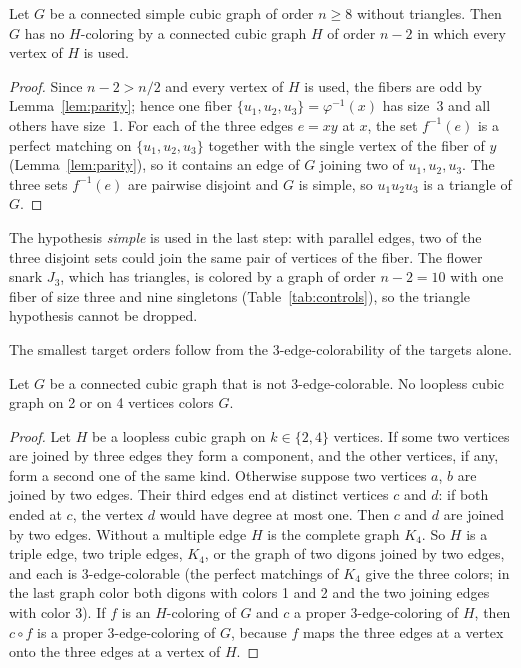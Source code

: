 \begin{proposition}[\evD]\label{prop:nminus2}
Let $G$ be a connected simple cubic graph of order $n \ge 8$ without triangles. Then $G$ has no
$H$-coloring by a connected cubic graph $H$ of order $n - 2$ in which every vertex of $H$ is used.
\end{proposition}

\begin{proof}
Since $n - 2 > n/2$ and every vertex of $H$ is used, the fibers are odd by
Lemma~\ref{lem:parity}; hence one fiber $\{u_1, u_2, u_3\} = \varphi^{-1}(x)$ has size~3 and all
others have size~1. For each of the three edges $e = xy$ at $x$, the set $f^{-1}(e)$ is a perfect matching on
$\{u_1, u_2, u_3\}$ together with the single vertex of the fiber of $y$
(Lemma~\ref{lem:parity}), so it contains an edge of $G$ joining two of $u_1, u_2, u_3$. The three
sets $f^{-1}(e)$ are pairwise disjoint and $G$ is simple, so $u_1u_2u_3$ is a triangle of $G$.
\end{proof}

The hypothesis \emph{simple} is used in the last step: with parallel edges, two of the three disjoint sets could join the
same pair of vertices of the fiber. The flower snark $J_3$, which has triangles, is colored by a graph of order $n - 2 = 10$ with
one fiber of size three and nine singletons (Table~\ref{tab:controls}), so the triangle hypothesis cannot be dropped.

The smallest target orders follow from the 3-edge-colorability of the targets alone.

\begin{proposition}[\evD]\label{prop:small}
Let $G$ be a connected cubic graph that is not 3-edge-colorable. No loopless cubic graph on 2 or on 4 vertices colors $G$.
\end{proposition}

\begin{proof}
Let $H$ be a loopless cubic graph on $k \in \{2, 4\}$ vertices. If some two vertices are joined by three edges they form a
component, and the other vertices, if any, form a second one of the same kind. Otherwise suppose two vertices $a$, $b$ are joined by two edges.
Their third edges end at distinct vertices $c$ and $d$: if both ended at $c$, the vertex $d$ would have degree at most one. Then $c$ and $d$ are
joined by two edges. Without a multiple edge $H$ is the complete graph $K_4$. So $H$ is a triple edge, two triple edges, $K_4$, or the
graph of two digons joined by two edges, and each is 3-edge-colorable (the perfect matchings of $K_4$ give the three colors; in the last graph
color both digons with colors 1 and 2 and the two joining edges with color 3). If $f$ is an $H$-coloring of $G$ and $c$ a proper 3-edge-coloring of
$H$, then $c \circ f$ is a proper 3-edge-coloring of $G$, because $f$ maps the three edges at a vertex onto the three edges at a vertex of $H$.
\end{proof}

